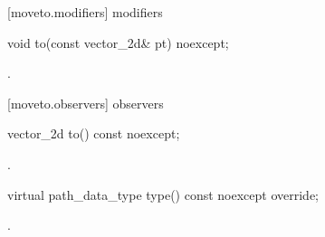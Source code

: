  [moveto.modifiers]{ modifiers}

\begin{itemdecl}
    void to(const vector_2d& pt) noexcept;
\end{itemdecl}
\begin{itemdescr}
	\pnum
	\postconditions
	.
	
\end{itemdescr}

 [moveto.observers]{ observers}

\begin{itemdecl}
    vector_2d to() const noexcept;
\end{itemdecl}
\begin{itemdescr}
	\pnum
	\returns
	.

\end{itemdescr}

\begin{itemdecl}
    virtual path_data_type type() const noexcept override;
\end{itemdecl}
\begin{itemdescr}
	\pnum
	\returns
	.

\end{itemdescr}
